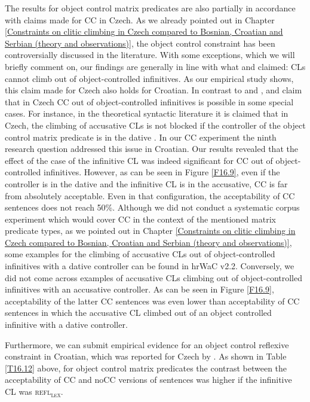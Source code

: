 The results for object control matrix predicates are also partially in accordance with claims made for CC in Czech. As we already pointed out in Chapter \ref{Constraints on clitic climbing in Czech compared to Bosnian, Croatian and Serbian (theory and observations)}, the object control constraint has been controversially discussed in the literature. With some exceptions, which we will briefly comment on, our findings are generally in line with what \citet[][]{Thorpe91} and \citet[][]{Junghanns02} claimed: CLs cannot climb out of object-controlled infinitives. As our empirical study shows, this claim made for Czech also holds for Croatian. In contrast to \citet[][]{Thorpe91} and \citet[][]{Junghanns02}, \citet[][]{Dotlacil04} and \citet[][]{Rezac05} claim that in Czech CC out of object-controlled infinitives is possible in some special cases. For instance, in the theoretical syntactic literature it is claimed that in Czech, the climbing of accusative CLs is not blocked if the controller of the object control matrix predicate is in the dative \citep[cf.][]{Rezac05}. In our CC experiment the ninth research question addressed this issue in Croatian. Our results revealed that the effect of the case of the infinitive CL was indeed significant for CC out of object-controlled infinitives. However, as can be seen in Figure \ref{F16.9}, even if the controller is in the dative and the infinitive CL is in the accusative, CC is far from absolutely acceptable. Even in that configuration, the acceptability of CC sentences does not reach 50\%. Although we did not conduct a systematic corpus experiment which would cover CC in the context of the mentioned matrix predicate types, as we pointed out in Chapter \ref{Constraints on clitic climbing in Czech compared to Bosnian, Croatian and Serbian (theory and observations)}, some examples for the climbing of accusative CLs out of object-controlled infinitives with a dative controller can be found in hrWaC v2.2. Conversely, we did not come across examples of accusative CLs climbing out of object-controlled infinitives with an accusative controller. As can be seen in Figure \ref{F16.9}, acceptability of the latter CC sentences was even lower than acceptability of CC sentences in which the accusative CL climbed out of an object controlled infinitive with a dative controller. 

Furthermore, we can submit empirical evidence for an object control reflexive constraint in Croatian, which was reported for Czech by \citet[][]{Hana07}. As shown in Table \ref{T16.12} above, for object control matrix predicates the contrast between the acceptability of CC and noCC versions of sentences was higher if the infinitive CL was \textsc{refl\textsubscript{\textsc{lex}}}. 


